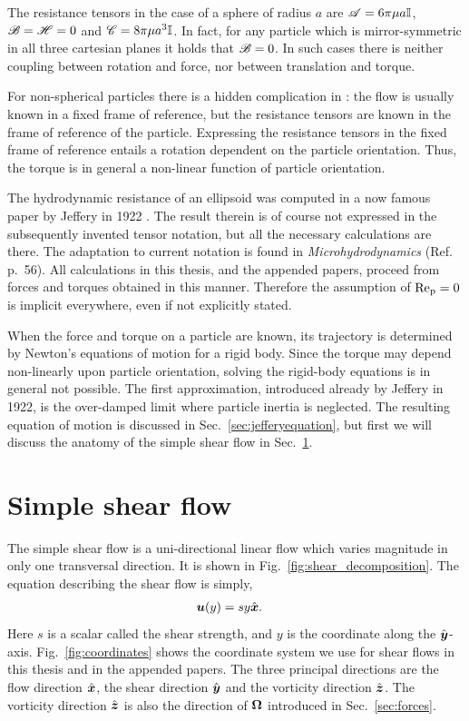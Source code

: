 \documentclass[thesis.tex]{subfiles}
\begin{document}
The resistance tensors in the case of a sphere of radius $a$ are  $\mathscr{A} = 6\pi\mu a \mathbb{I}$, $\mathscr{B}=\mathscr{H} = 0$ and $\mathscr{C} = 8\pi\mu a^3 \mathbb{I}$. In fact, for any particle which is mirror-symmetric in all three cartesian planes it holds that $\mathscr{B} = 0$. In such cases there is neither coupling between rotation and force, nor between translation and torque. 

For non-spherical particles there is a hidden complication in : the flow is usually known in a fixed frame of reference, but the resistance tensors are known in the frame of reference of the particle. Expressing the resistance tensors in the fixed frame of reference entails a rotation dependent on the particle orientation. Thus, the torque is in general a non-linear function of particle orientation.

The hydrodynamic resistance of an ellipsoid was computed in a now famous paper by Jeffery in 1922 \cite{jeffery1922}. The result therein is of course not expressed in the subsequently invented tensor notation, but all the necessary calculations are there. The adaptation to current notation is found in \emph{Microhydrodynamics} (Ref.~ p.~56). All calculations in this thesis, and the appended papers, proceed from forces and torques obtained in this manner. Therefore the assumption of $\mbox{Re}_{\mathrm p} = 0$ is implicit everywhere, even if not explicitly stated.

When the force and torque on a particle are known, its trajectory is determined by Newton's equations of motion for a rigid body. Since the torque may depend non-linearly upon particle orientation, solving the rigid-body equations is in general not possible. The first approximation, introduced already by Jeffery in 1922, is the over-damped limit where particle inertia is neglected. The resulting equation of motion is discussed in Sec.~\ref{sec:jefferyequation}, but first we will discuss the anatomy of the simple shear flow in Sec.~\ref{sec:shearflow}.

\section{Simple shear flow}\label{sec:shearflow}

The simple shear flow is a uni-directional linear flow which varies magnitude in only one transversal direction. It is shown in Fig.~\ref{fig:shear_decomposition}. The equation describing the shear flow is simply,
\begin{align*}
	\mbox{\boldmath$u$}(y) &= s y \hat{\mbox{\boldmath$x$}}.
\end{align*}
Here $s$ is a scalar called the shear strength, and $y$ is the coordinate along the $\hat{\mbox{\boldmath$y$}}$-axis. 
Fig.~\ref{fig:coordinates} shows the coordinate system we use for shear flows in this thesis and in the appended papers. The three principal directions are the flow direction $\hat{\mbox{\boldmath$x$}}$, the shear direction $\hat{\mbox{\boldmath$y$}}$ and the vorticity direction $\hat{\mbox{\boldmath$z$}}$. The vorticity direction $\hat{\mbox{\boldmath$z$}}$ is also the direction of $\mbox{\boldmath$\Omega$}$ introduced in Sec.~\ref{sec:forces}.
\end{document}
